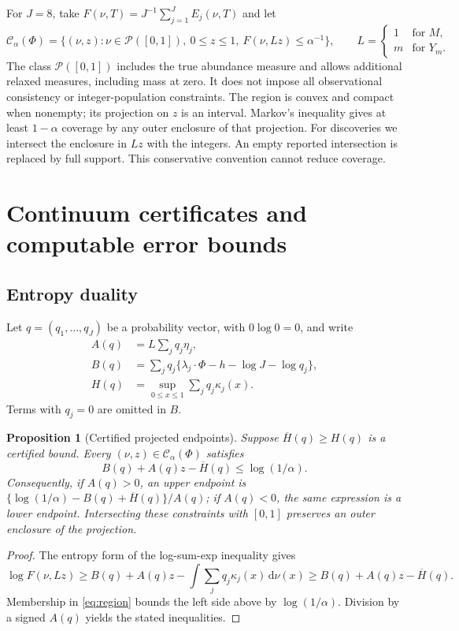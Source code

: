 \documentclass[11pt]{article}
\newtheorem{proposition}[theorem]{Proposition}
\theoremstyle{remark}\newtheorem{remark}[theorem]{Remark}
\newcommand{\dd}{\,\mathrm d}\newcommand{\ind}{\mathbf1}
\begin{document}
For $J=8$, take $F(\nu,T)=J^{-1}\sum_{j=1}^J E_j(\nu,T)$ and let
\begin{equation}\label{eq:region}
 \mathcal C_\alpha(\Phi)=
 \{(\nu,z):\nu\in\mathcal P([0,1]),\ 0\le z\le1,
                      \ F(\nu,Lz)\le\alpha^{-1}\},
 \qquad L=\begin{cases}1&\text{for }M,\\m&\text{for }Y_m.\end{cases}
\end{equation}
The class $\mathcal P([0,1])$ includes the true abundance measure and allows
additional relaxed measures, including mass at zero. It does not impose all
observational consistency or integer-population constraints. The region is
convex and compact when nonempty; its projection on $z$ is an interval.
Markov's inequality gives at least $1-\alpha$ coverage by any outer enclosure
of that projection. For discoveries we intersect the enclosure in $Lz$ with
the integers. An empty reported intersection is replaced by full support.
This conservative convention cannot reduce coverage.

\section{Continuum certificates and computable error bounds}
\subsection{Entropy duality}
Let $q=(q_1,\ldots,q_J)$ be a probability vector, with $0\log0=0$, and write
\begin{align*}
 A(q)&=L\sum_jq_j\eta_j,\\
 B(q)&=\sum_jq_j\{\lambda_j\cdot\Phi-h-\log J-\log q_j\},\\
 H(q)&=\sup_{0\le x\le1}\sum_jq_j\kappa_j(x).
\end{align*}
Terms with $q_j=0$ are omitted in $B$.
\begin{proposition}[Certified projected endpoints]\label{prop:dual}
Suppose $\overline H(q)\ge H(q)$ is a certified bound. Every
$(\nu,z)\in\mathcal C_\alpha(\Phi)$ satisfies
\[
 B(q)+A(q)z-\overline H(q)\le\log(1/\alpha).
\]
Consequently, if $A(q)>0$, an upper endpoint is
$\{\log(1/\alpha)-B(q)+\overline H(q)\}/A(q)$; if $A(q)<0$, the same expression
is a lower endpoint. Intersecting these constraints with $[0,1]$ preserves an
outer enclosure of the projection.
\end{proposition}
\begin{proof}
The entropy form of the log-sum-exp inequality gives
\[
 \log F(\nu,Lz)\ge B(q)+A(q)z
              -\int\sum_jq_j\kappa_j(x)\dd\nu(x)
 \ge B(q)+A(q)z-\overline H(q).
\]
Membership in \eqref{eq:region} bounds the left side above by
$\log(1/\alpha)$. Division by a signed $A(q)$ yields the stated inequalities.
\end{proof}
\end{document}
